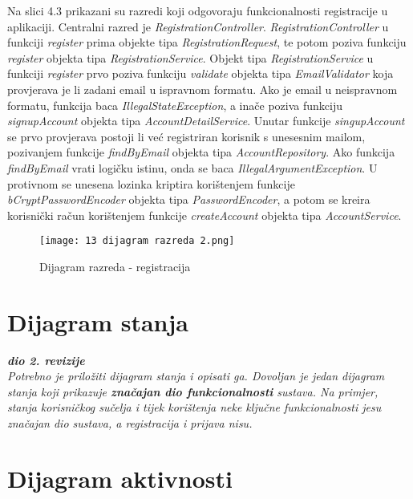 			Na slici 4.3 prikazani su razredi koji odgovoraju funkcionalnosti registracije u aplikaciji. Centralni razred je \textit{RegistrationController}. \textit{RegistrationController} u funkciji \textit{register} prima objekte tipa \textit{RegistrationRequest}, te potom poziva funkciju \textit{register} objekta tipa \textit{RegistrationService}. Objekt tipa \textit{RegistrationService} u funkciji \textit{register} prvo poziva funkciju \textit{validate} objekta tipa \textit{EmailValidator} koja provjerava je li zadani email u ispravnom formatu. Ako je email u neispravnom formatu, funkcija baca \textit{IllegalStateException}, a inače poziva funkciju \textit{signupAccount} objekta tipa \textit{AccountDetailService}. Unutar funkcije \textit{singupAccount} se prvo provjerava postoji li već registriran korisnik s unesesnim mailom, pozivanjem funkcije \textit{findByEmail} objekta tipa \textit{AccountRepository}. Ako funkcija \textit{findByEmail} vrati logičku istinu, onda se baca \textit{IllegalArgumentException}. U protivnom se unesena lozinka kriptira korištenjem funkcije \textit{bCryptPasswordEncoder} objekta tipa \textit{PasswordEncoder}, a potom se kreira korisnički račun korištenjem funkcije \textit{createAccount} objekta tipa \textit{AccountService}.
			
			\begin{figure}[H]
		\centering
		\texttt{[image: 13 dijagram razreda 2.png]}
		\caption{Dijagram razreda - registracija}
		\end{figure}
		
			\eject
		
		\section{Dijagram stanja}
			
			
			\textbf{\textit{dio 2. revizije}}\\
			
			\textit{Potrebno je priložiti dijagram stanja i opisati ga. Dovoljan je jedan dijagram stanja koji prikazuje \textbf{značajan dio funkcionalnosti} sustava. Na primjer, stanja korisničkog sučelja i tijek korištenja neke ključne funkcionalnosti jesu značajan dio sustava, a registracija i prijava nisu. }
			
			
			\eject 
		
		\section{Dijagram aktivnosti}
			
